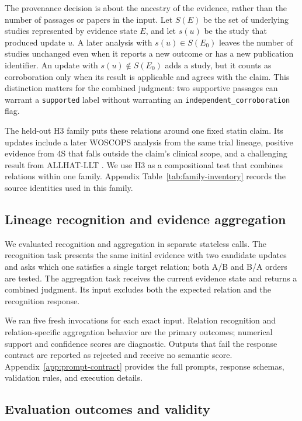 \documentclass[11pt]{article}
\begin{document}
The provenance decision is about the ancestry of the evidence, rather than the number of passages or papers in the input. Let $S(E)$ be the set of underlying studies represented by evidence state $E$, and let $s(u)$ be the study that produced update $u$. A later analysis with $s(u)\in S(E_0)$ leaves the number of studies unchanged even when it reports a new outcome or has a new publication identifier. An update with $s(u)\notin S(E_0)$ adds a study, but it counts as corroboration only when its result is applicable and agrees with the claim. This distinction matters for the combined judgment: two supportive passages can warrant a \texttt{supported} label without warranting an \texttt{independent\_corroboration} flag.

The held-out H3 family puts these relations around one fixed statin claim. Its updates include a later WOSCOPS analysis from the same trial lineage, positive evidence from 4S that falls outside the claim's clinical scope, and a challenging result from ALLHAT-LLT \citep{shepherd-etal-1995-woscops,vallejo-vaz-etal-2017-woscops,scandinavian-1994-4s,allhat-2002-llt}. We use H3 as a compositional test that combines relations within one family. Appendix Table~\ref{tab:family-inventory} records the source identities used in this family.

\subsection{Lineage recognition and evidence aggregation}

We evaluated recognition and aggregation in separate stateless calls. The recognition task presents the same initial evidence with two candidate updates and asks which one satisfies a single target relation; both A/B and B/A orders are tested. The aggregation task receives the current evidence state and returns a combined judgment. Its input excludes both the expected relation and the recognition response.

We ran five fresh invocations for each exact input. Relation recognition and relation-specific aggregation behavior are the primary outcomes; numerical support and confidence scores are diagnostic. Outputs that fail the response contract are reported as rejected and receive no semantic score. Appendix~\ref{app:prompt-contract} provides the full prompts, response schemas, validation rules, and execution details.

\subsection{Evaluation outcomes and validity}
\end{document}

